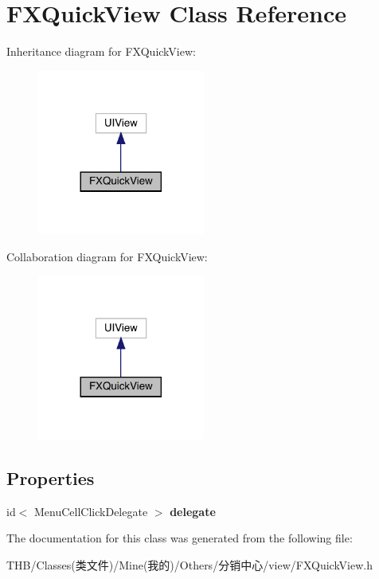\hypertarget{interface_f_x_quick_view}{}\section{F\+X\+Quick\+View Class Reference}
\label{interface_f_x_quick_view}


Inheritance diagram for F\+X\+Quick\+View\+:\nopagebreak
\begin{figure}[H]
\begin{center}
\leavevmode
\includegraphics[width=156pt]{interface_f_x_quick_view__inherit__graph}
\end{center}
\end{figure}


Collaboration diagram for F\+X\+Quick\+View\+:\nopagebreak
\begin{figure}[H]
\begin{center}
\leavevmode
\includegraphics[width=156pt]{interface_f_x_quick_view__coll__graph}
\end{center}
\end{figure}
\subsection*{Properties}
\begin{DoxyCompactItemize}
\item 
\mbox{\label{interface_f_x_quick_view_a74b684285c03720ffc5d830dd51fec3f}} 
id$<$ Menu\+Cell\+Click\+Delegate $>$ {\bfseries delegate}
\end{DoxyCompactItemize}


The documentation for this class was generated from the following file\+:\begin{DoxyCompactItemize}
\item 
T\+H\+B/\+Classes(类文件)/\+Mine(我的)/\+Others/分销中心/view/F\+X\+Quick\+View.\+h\end{DoxyCompactItemize}
